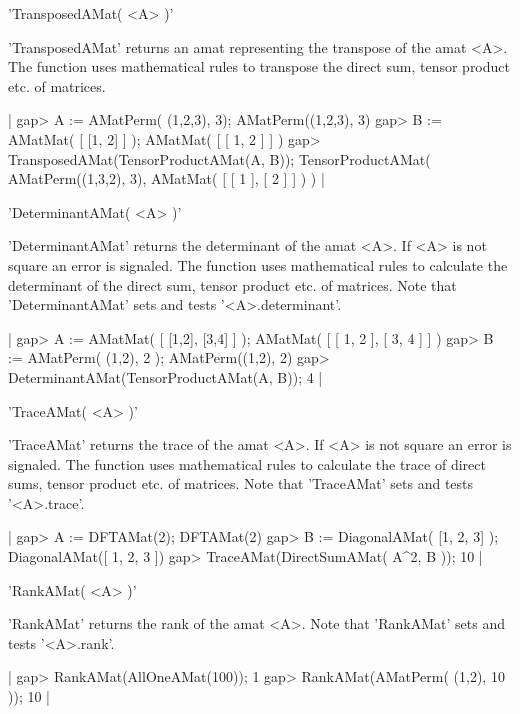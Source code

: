 'TransposedAMat( <A> )'

'TransposedAMat' returns an amat representing the transpose of the 
amat <A>.
The function uses mathematical rules to transpose the direct sum, 
tensor product etc. of matrices.

|    gap> A := AMatPerm( (1,2,3), 3);
    AMatPerm((1,2,3), 3)
    gap> B := AMatMat( [ [1, 2] ] );
    AMatMat(
      [ [ 1, 2 ] ]
    )
    gap> TransposedAMat(TensorProductAMat(A, B));
    TensorProductAMat(
      AMatPerm((1,3,2), 3),
      AMatMat(
        [ [ 1 ], [ 2 ] ]
      )
    ) |


'DeterminantAMat( <A> )'

'DeterminantAMat' returns the determinant of the amat <A>. If 
<A> is not square an error is signaled.
The function uses mathematical rules to calculate the determinant of
the direct sum, tensor product etc. of matrices.
Note that 'DeterminantAMat' sets and tests '<A>.determinant'.

|    gap> A := AMatMat( [ [1,2], [3,4] ] );
    AMatMat(
      [ [ 1, 2 ], [ 3, 4 ] ]
    )
    gap> B := AMatPerm( (1,2), 2 );
    AMatPerm((1,2), 2)
    gap> DeterminantAMat(TensorProductAMat(A, B));
    4 |


'TraceAMat( <A> )'

'TraceAMat' returns the trace of the amat <A>. If 
<A> is not square an error is signaled.
The function uses mathematical rules to calculate the trace of
direct sums, tensor product etc. of matrices.
Note that 'TraceAMat' sets and tests '<A>.trace'.

|    gap> A := DFTAMat(2);
    DFTAMat(2)
    gap> B := DiagonalAMat( [1, 2, 3] );
    DiagonalAMat([ 1, 2, 3 ])
    gap> TraceAMat(DirectSumAMat( A^2, B ));
    10 |


'RankAMat( <A> )'

'RankAMat' returns the rank of the amat <A>. Note that 'RankAMat'
sets and tests '<A>.rank'.

|    gap> RankAMat(AllOneAMat(100));
    1
    gap> RankAMat(AMatPerm( (1,2), 10 ));
    10 |


